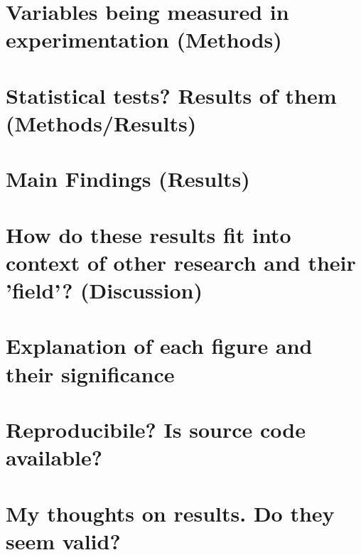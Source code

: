 \documentclass{article}
\begin{document}
\section{Variables being measured in experimentation (Methods)}

\section{Statistical tests? Results of them (Methods/Results)}

\section{Main Findings (Results)}

\section{How do these results fit into context of other research and their 'field'? (Discussion)}

\section{Explanation of each figure and their significance}

\section{Reproducibile? Is source code available?}

\section{My thoughts on results. Do they seem valid?}
\end{document}
